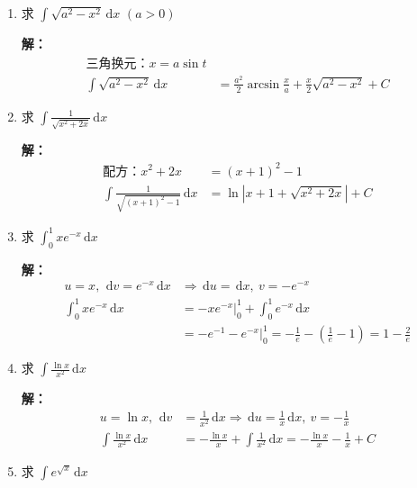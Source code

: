 \documentclass[12pt,a4paper]{article}
\newcommand{\dd}{\,\mathrm{d}}
\begin{document}
\begin{enumerate}[label=\textbf{\arabic*.}, leftmargin=*, itemsep=1.2em]
\textbf{解：}
\begin{align*}
\text{分部积分：} \quad u=\sqrt{x^2+a^2}, \dd v=\dd x \\
\int \sqrt{x^2+a^2} \dd x &= \frac{x}{2}\sqrt{x^2+a^2} + \frac{a^2}{2} \ln\left( x + \sqrt{x^2+a^2} \right) + C
\end{align*}

\item 求 $\displaystyle \int \sqrt{a^2 - x^2} \dd x$ $(a>0)$

\textbf{解：}
\begin{align*}
\text{三角换元：} x=a\sin t \\
\int \sqrt{a^2 - x^2} \dd x &= \frac{a^2}{2} \arcsin\frac{x}{a} + \frac{x}{2}\sqrt{a^2 - x^2} + C
\end{align*}

\item 求 $\displaystyle \int \frac{1}{\sqrt{x^2 + 2x}} \dd x$

\textbf{解：}
\begin{align*}
\text{配方：} x^2+2x &= (x+1)^2 - 1 \\
\int \frac{1}{\sqrt{(x+1)^2 - 1}} \dd x &= \ln \left| x+1 + \sqrt{x^2+2x} \right| + C
\end{align*}

\item 求 $\displaystyle \int_0^1 x e^{-x} \dd x$

\textbf{解：}
\begin{align*}
u=x,\ \dd v=e^{-x}\dd x &\Rightarrow \dd u=\dd x,\ v=-e^{-x}\\
\int_0^1 x e^{-x} \dd x &= -x e^{-x}\big|_0^1 + \int_0^1 e^{-x} \dd x\\
&= -e^{-1} - e^{-x}\big|_0^1 = -\frac{1}{e} - \left(\frac{1}{e}-1\right) = 1 - \frac{2}{e}
\end{align*}

\item 求 $\displaystyle \int \frac{\ln x}{x^2} \dd x$

\textbf{解：}
\begin{align*}
u=\ln x,\ \dd v&=\frac{1}{x^2}\dd x \Rightarrow \dd u=\frac{1}{x}\dd x,\ v=-\frac{1}{x}\\
\int \frac{\ln x}{x^2} \dd x &= -\frac{\ln x}{x} + \int \frac{1}{x^2} \dd x = -\frac{\ln x}{x} - \frac{1}{x} + C
\end{align*}

\item 求 $\displaystyle \int e^{\sqrt{x}} \dd x$


\end{enumerate}
\end{document}
